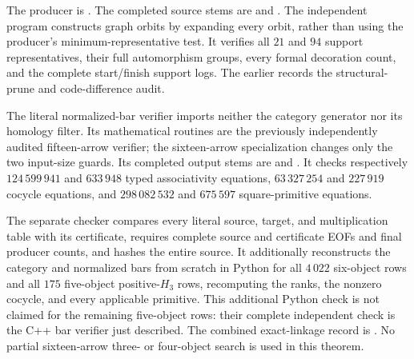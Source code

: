 \begin{remark}
\label{C:sixteen-five-six-verification}
The producer is .
The completed source stems are
 and
.
The independent program 
constructs graph orbits by expanding every orbit, rather than
using the producer's minimum-representative test.  It verifies
all $21$ and $94$ support representatives, their full
automorphism groups, every formal decoration count, and the
complete start/finish support logs.  The earlier
 records the
structural-prune and code-difference audit.

The literal normalized-bar verifier
 imports neither the category
generator nor its homology filter.  Its mathematical routines
are the previously independently audited fifteen-arrow
verifier; the sixteen-arrow specialization changes only the
two input-size guards.  Its completed output stems are
 and
.
It checks respectively $124\,599\,941$ and $633\,948$ typed
associativity equations, $63\,327\,254$ and $227\,919$
cocycle equations, and $298\,082\,532$ and $675\,597$
square-primitive equations.

The separate checker 
compares every literal source, target, and multiplication table
with its certificate, requires complete source and certificate
EOFs and final producer counts, and hashes the entire source.
It additionally reconstructs the category and normalized bars
from scratch in Python for all $4\,022$ six-object rows and
all $175$ five-object positive-$H_3$ rows, recomputing the
ranks, the nonzero cocycle, and every applicable primitive.
This additional Python check is not claimed for the remaining
five-object rows: their complete independent check is the
C++ bar verifier just described.  The combined exact-linkage
record is .
No partial sixteen-arrow three- or four-object search is used
in this theorem.
\end{remark}
